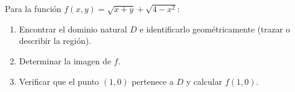 Para la función $f(x,y) = \sqrt{x + y} + \sqrt{4 - x^2}$:
\begin{enumerate}
    \item Encontrar el dominio natural $D$ e identificarlo geométricamente (trazar o describir la región).
    \item Determinar la imagen de $f$.
    \item Verificar que el punto $(1, 0)$ pertenece a $D$ y calcular $f(1, 0)$.
\end{enumerate}